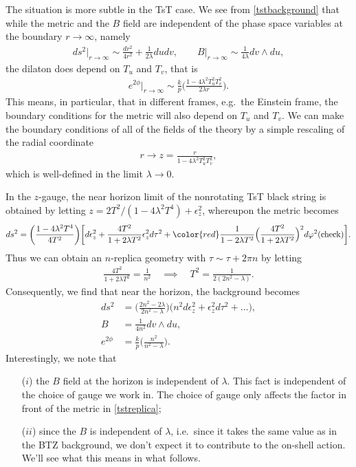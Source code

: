 \documentclass[11pt,a4paper]{article}
\def\l{\lambda}
\def\vp{\varphi}
\def\we{\wedge}
\newcommand{\eq}[1]{\begin{align}#1\end{align}}
\newcommand{\eqsp}[1]{\begin{equation}\begin{split}#1\end{split}\end{equation}}
\begin{document}
The situation is more subtle in the TsT case. We see from \eqref{tstbackground} that while the metric and the $B$ field are independent of the phase space variables at the boundary $r \to \infty$, namely
\eq{
ds^2\big|_{r\to \infty} \sim \frac{dr^2}{4r^2} + \frac{1}{2\l} du dv, \qquad B\big|_{r\to\infty} \sim \frac{1}{4\l} dv \we du,
}
the dilaton does depend on $T_u$ and $T_v$, that is
\eq{
e^{2\phi} \big|_{r\to\infty} \sim \frac{k}{p} \bigg(\frac{1 - 4 \l^2 T_u^2 T_v^2}{2\l r}\bigg) .
}
This means, in particular, that in different frames, e.g.~the Einstein frame, the boundary conditions for the metric will also depend on $T_u$ and $T_v$. We can make the boundary conditions of all of the fields of the theory by a simple rescaling of the radial coordinate
\eq{
r \to z = \frac{r}{1 - 4 \l^2 T_u^2 T_v^2},
}
which is well-defined in the limit $\l\to 0$. 

In the $z$-gauge, the near horizon limit of the nonrotating TsT black string is obtained by letting $z = 2T^2/(1 - 4 \l^2 T^4) + \epsilon_z^2$, whereupon the metric becomes
\eq{
ds^2 =  \bigg(\frac{1 - 4 \l^2 T^4}{4T^2} \bigg) \bigg[ d\epsilon_z^2 + \frac{4 T^2}{1 + 2 \l T^2} \epsilon_z^2 d\tau^2 + {\color{red} \frac{1}{1-2\l T^2}\Big(\frac{4T^2}{1+2\l T^2}\Big)^2 d\vp^2 \textrm{(check)}}   \bigg].
}
Thus we can obtain an $n$-replica geometry with $\tau \sim \tau + 2 \pi n$ by letting
\eq{
\frac{4 T^2}{1 + 2 \l T^2} = \frac{1}{n^2} \quad \implies \quad T^2 = \frac{1}{2(2n^2 - \l)}.
}
Consequently, we find that near the horizon, the background becomes
\eqsp{
ds^2 &= \bigg(\frac{2n^2 - 2 \l}{2n^2 - \l} \bigg) \big( n^2 d\epsilon_z^2 + \epsilon_z^2 d\tau^2 + \dots \big), \\
B&= \frac{1}{4n^2} dv \wedge du, \\
e^{2\phi} &= \frac{k}{p} \bigg( \frac{n^2}{n^2 - \l} \bigg). \label{tstreplica}
}
Interestingly, we note that 
\begin{itemize}
\item[($i$)] the $B$ field at the horizon is independent of $\lambda$. This fact is independent of the choice of gauge we work in. The choice of gauge only affects the factor in front of the metric in \eqref{tstreplica};
\item[($ii$)] since the $B$ is independent of $\l$, i.e.~since it takes the same value as in the BTZ background, we don't expect it to contribute to the on-shell action. We'll see what this means in what follows.
\end{itemize}

\end{document}
